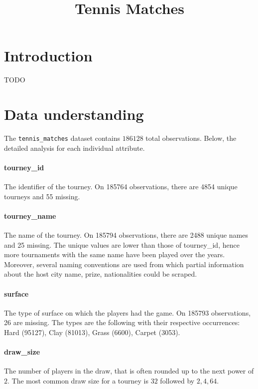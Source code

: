 \documentclass{article}
\title{Tennis Matches}
\begin{document}
    

\tableofcontents
\newpage

\section{Introduction}
TODO

\section{Data understanding}
The \texttt{tennis\_matches} dataset contains $186128$ total observations. Below, the detailed analysis for each individual attribute.

\paragraph{tourney\_id}
The identifier of the tourney. On 185764 observations, there are 4854 unique tourneys and 55 missing.

\paragraph{tourney\_name}
The name of the tourney. On 185794 observations, there are 2488 unique names and 25 missing. The unique values are lower than those of tourney\_id, hence more tournaments with the same name have been played over the years. Moreover, several naming conventions are used from which partial information about the host city name, prize, nationalities could be scraped.

\paragraph{surface}
The type of surface on which the players had the game. On 185793 observations, 26 are missing. The types are the following with their respective occurrences: Hard (95127), Clay (81013), Grass (6600), Carpet (3053).

\paragraph{draw\_size}
The number of players in the draw, that is often rounded up to the next power of $2$. The most common draw size for a tourney is $32$ followed by $2,4,64$.
\end{document}
